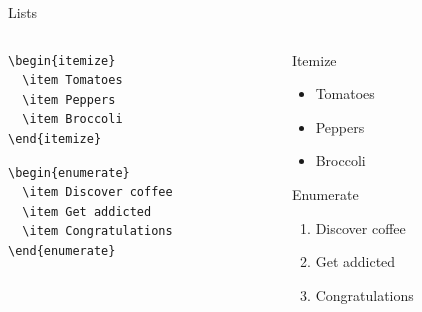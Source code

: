 \documentclass[xetex, onlymath]{beamer}
\begin{document}
\begin{frame}[fragile]{Lists}
\begin{columns}
\begin{column}{.5\linewidth}
\begin{lstlisting}
\begin{itemize}
  \item Tomatoes
  \item Peppers
  \item Broccoli
\end{itemize}
\end{lstlisting}

\begin{lstlisting}
\begin{enumerate}
  \item Discover coffee
  \item Get addicted
  \item Congratulations
\end{enumerate}
\end{lstlisting}
\end{column}

\begin{column}{.4\linewidth}
\begin{exampleblock}{Itemize}
	\begin{itemize}
		\item Tomatoes
		\item Peppers
		\item Broccoli
	\end{itemize}
\end{exampleblock}
\begin{exampleblock}{Enumerate}
	\begin{enumerate}
		\item Discover coffee
		\item Get addicted
		\item Congratulations
	\end{enumerate}
\end{exampleblock}
\end{column}
\end{columns}
\end{frame}
\end{document}
